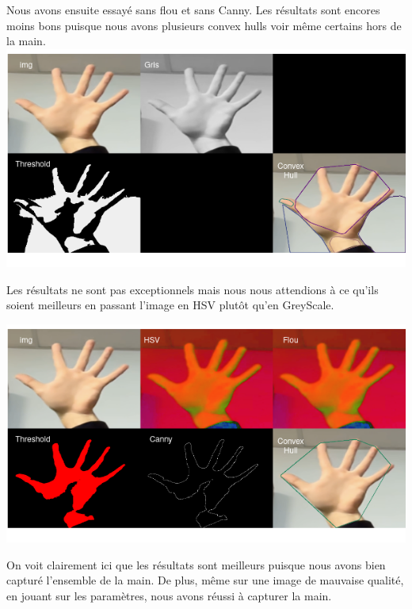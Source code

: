 \documentclass[11pt]{article}
\begin{document}
\bigbreak

Nous avons ensuite essayé sans flou et sans Canny. Les résultats sont encores moins bons puisque nous avons plusieurs convex hulls voir même certains hors de la main. \bigbreak
\includegraphics[width=\textwidth]{images/pre_ttt_3.png}

\bigbreak

Les résultats ne sont pas exceptionnels mais nous nous attendions à ce qu'ils soient meilleurs en passant l'image en HSV plutôt qu'en GreyScale.  \bigbreak

\includegraphics[width=\textwidth]{images/pre_ttt_4.png}
\bigbreak

On voit clairement ici que les résultats sont meilleurs puisque nous avons bien capturé l'ensemble de la main. De plus, même sur une image de mauvaise qualité, en jouant sur les paramètres, nous avons réussi à capturer la main. \bigbreak
\end{document}
